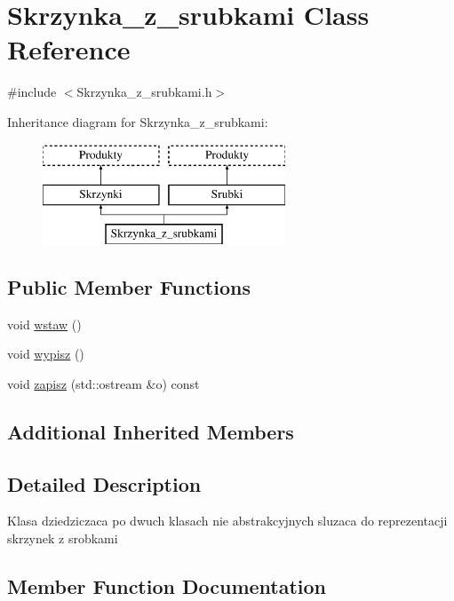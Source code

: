 \hypertarget{class_skrzynka__z__srubkami}{}\section{Skrzynka\+\_\+z\+\_\+srubkami Class Reference}
\label{class_skrzynka__z__srubkami}


{\ttfamily \#include $<$Skrzynka\+\_\+z\+\_\+srubkami.\+h$>$}

Inheritance diagram for Skrzynka\+\_\+z\+\_\+srubkami\+:\begin{figure}[H]
\begin{center}
\leavevmode
\includegraphics[height=3.000000cm]{class_skrzynka__z__srubkami}
\end{center}
\end{figure}
\subsection*{Public Member Functions}
\begin{DoxyCompactItemize}
\item 
void \mbox{\hyperlink{class_skrzynka__z__srubkami_a4726c1844080cb96e833cf16e977ecb3}{wstaw}} ()
\item 
void \mbox{\hyperlink{class_skrzynka__z__srubkami_ac543a438ce88bc79a9e8a398b6beff7c}{wypisz}} ()
\item 
void \mbox{\hyperlink{class_skrzynka__z__srubkami_a62ccdf02cb9d364630ebea27ea94f2a3}{zapisz}} (std\+::ostream \&o) const
\end{DoxyCompactItemize}
\subsection*{Additional Inherited Members}


\subsection{Detailed Description}
Klasa dziedziczaca po dwuch klasach nie abstrakcyjnych sluzaca do reprezentacji skrzynek z srobkami 

\subsection{Member Function Documentation}
\mbox{\label{class_skrzynka__z__srubkami_a4726c1844080cb96e833cf16e977ecb3}} 

